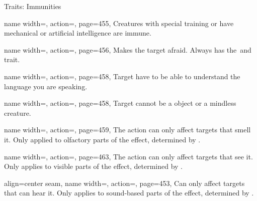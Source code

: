 \begin{PageFrontLandscape}
\begin{TablesHalf}{\frontTableHeight}
\begin{Table}{Traits: Immunities}
\begin{entry}{}{%
                name width=\conditionLength,%
                action=\Emotion,
                page=455,
            }
                Creatures with special training or have mechanical or artificial intelligence are immune.
            \end{entry}
            \begin{entry}{}{%
                name width=\conditionLength,%
                action=\Fear,
                page=456,
            }
                Makes the target afraid. Always has the \Mental\,and \Emotion\,trait.
            \end{entry}
            \begin{entry}{}{%
                name width=\conditionLength,%
                action=\Linguistic,
                page=458,
            }
                Target have to be able to understand the language you are speaking.
            \end{entry}
            \begin{entry}{}{%
                name width=\conditionLength,%
                action=\Mental,
                page=458,
            }
                Target cannot be a object or a mindless creature.
            \end{entry}
            \begin{entry}{}{%
                name width=\conditionLength,%
                action=\Olfactory,
                page=459,
            }
                The action can only affect targets that smell it. \hfill
                Only applied to olfactory parts of the effect, determined by \GM.
            \end{entry}
            \begin{entry}{}{%
                name width=\conditionLength,%
                action=\Visual,
                page=463,
            }
                The action can only affect targets that see it.\hfill
                Only applies to visible parts of the effect, determined by \GM.
            \end{entry}
            \begin{entry}{}{%
                align=center seam,
                name width=\conditionLength,%
                action=\Auditory,
                page=453,
            }
                Can only affect targets that can hear it. \hfill
                Only applies to sound-based parts of the effect, determined by \GM.\\
            \end{entry}
        \end{Table}

\end{TablesHalf}
\end{PageFrontLandscape}
